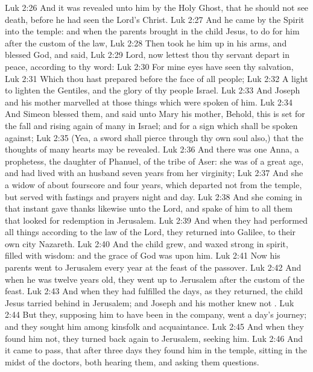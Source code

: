 \vs Luk 2:26 And it was revealed unto him by the Holy Ghost, that he should not see death, before he had seen the Lord's Christ.
\vs Luk 2:27 And he came by the Spirit into the temple: and when the parents brought in the child Jesus, to do for him after the custom of the law,
\vs Luk 2:28 Then took he him up in his arms, and blessed God, and said,
\vs Luk 2:29 Lord, now lettest thou thy servant depart in peace, according to thy word:
\vs Luk 2:30 For mine eyes have seen thy salvation,
\vs Luk 2:31 Which thou hast prepared before the face of all people;
\vs Luk 2:32 A light to lighten the Gentiles, and the glory of thy people Israel.
\vs Luk 2:33 And Joseph and his mother marvelled at those things which were spoken of him.
\vs Luk 2:34 And Simeon blessed them, and said unto Mary his mother, Behold, this  is set for the fall and rising again of many in Israel; and for a sign which shall be spoken against;
\vs Luk 2:35 (Yea, a sword shall pierce through thy own soul also,) that the thoughts of many hearts may be revealed.
\vs Luk 2:36 And there was one Anna, a prophetess, the daughter of Phanuel, of the tribe of Aser: she was of a great age, and had lived with an husband seven years from her virginity;
\vs Luk 2:37 And she  a widow of about fourscore and four years, which departed not from the temple, but served  with fastings and prayers night and day.
\vs Luk 2:38 And she coming in that instant gave thanks likewise unto the Lord, and spake of him to all them that looked for redemption in Jerusalem.
\vs Luk 2:39 And when they had performed all things according to the law of the Lord, they returned into Galilee, to their own city Nazareth.
\vs Luk 2:40 And the child grew, and waxed strong in spirit, filled with wisdom: and the grace of God was upon him.
\vs Luk 2:41 Now his parents went to Jerusalem every year at the feast of the passover.
\vs Luk 2:42 And when he was twelve years old, they went up to Jerusalem after the custom of the feast.
\vs Luk 2:43 And when they had fulfilled the days, as they returned, the child Jesus tarried behind in Jerusalem; and Joseph and his mother knew not .
\vs Luk 2:44 But they, supposing him to have been in the company, went a day's journey; and they sought him among  kinsfolk and acquaintance.
\vs Luk 2:45 And when they found him not, they turned back again to Jerusalem, seeking him.
\vs Luk 2:46 And it came to pass, that after three days they found him in the temple, sitting in the midst of the doctors, both hearing them, and asking them questions.
